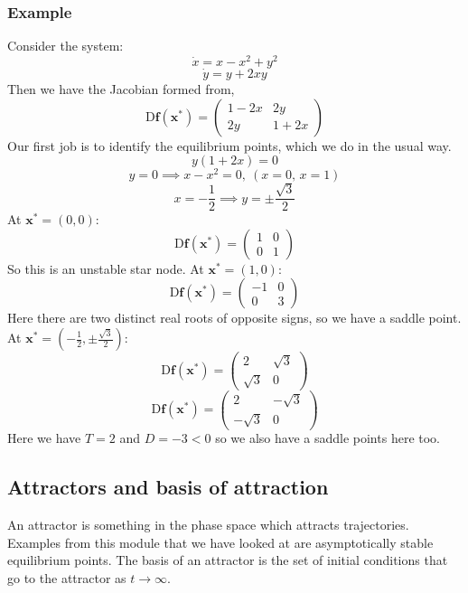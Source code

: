 \documentclass[12pt]{article}
\begin{document}
\subsubsection*{Example}
Consider the system:
\[\dot{x}=x-x^2+y^2\]
\[\dot{y}=y+2xy\]
Then we have the Jacobian formed from,
\[\text{D}\textbf{f}(\textbf{x}^*)=\begin{pmatrix}
    1-2x & 2y \\
    2y & 1+2x
\end{pmatrix}\]
Our first job is to identify the equilibrium points, which we do in the usual way.
\[y(1+2x)=0\]
\[y=0\implies x-x^2=0,\  (x=0,\,x=1)\]
\[x=-\frac{1}{2}\implies y=\pm\frac{\sqrt{3}}{2}\]
At \(\textbf{x}^*=(0,0)\):
\[\text{D}\textbf{f}(\textbf{x}^*)=\begin{pmatrix}
    1 & 0 \\
    0 & 1
\end{pmatrix}\]
So this is an unstable star node. At \(\textbf{x}^*=(1,0)\):
\[\text{D}\textbf{f}(\textbf{x}^*)=\begin{pmatrix}
    -1 & 0 \\
    0 & 3
\end{pmatrix}\]
Here there are two distinct real roots of opposite signs, so we have a saddle point. At \(\textbf{x}^*=(-\frac{1}{2},\pm\frac{\sqrt{3}}{2})\):
\[\text{D}\textbf{f}(\textbf{x}^*)=\begin{pmatrix}
    2 & \sqrt{3} \\
    \sqrt{3} & 0
\end{pmatrix}\]
\[\text{D}\textbf{f}(\textbf{x}^*)=\begin{pmatrix}
    2 & -\sqrt{3} \\
    -\sqrt{3} & 0
\end{pmatrix}\]
Here we have \(T=2\) and \(D=-3<0\) so we also have a saddle points here too.
\subsection*{Attractors and basis of attraction}
An attractor is something in the phase space which attracts trajectories. Examples from this module that we have looked at are asymptotically stable equilibrium points. The basis of an attractor is the set of initial conditions that go to the attractor as \(t\to\infty\).
\end{document}
